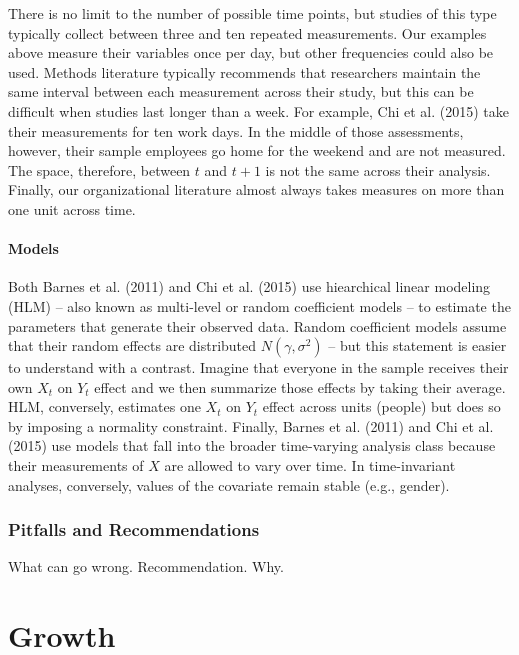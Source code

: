 \documentclass[english,,man]{apa6}
\let\oldparagraph\paragraph
\renewcommand{\paragraph}[1]{\oldparagraph{#1}\mbox{}}
\theoremstyle{definition}
\theoremstyle{definition}
\theoremstyle{definition}
\theoremstyle{remark}
\begin{document}
There is no limit to the number of possible time points, but studies of
this type typically collect between three and ten repeated measurements.
Our examples above measure their variables once per day, but other
frequencies could also be used. Methods literature typically recommends
that researchers maintain the same interval between each measurement
across their study, but this can be difficult when studies last longer
than a week. For example, Chi et al. (2015) take their measurements for
ten work days. In the middle of those assessments, however, their sample
employees go home for the weekend and are not measured. The space,
therefore, between \(t\) and \(t + 1\) is not the same across their
analysis. Finally, our organizational literature almost always takes
measures on more than one unit across time.

\hypertarget{models}{%
\paragraph{Models}\label{models}}

Both Barnes et al. (2011) and Chi et al. (2015) use hiearchical linear
modeling (HLM) -- also known as multi-level or random coefficient models
-- to estimate the parameters that generate their observed data. Random
coefficient models assume that their random effects are distributed
\(N(\gamma, \sigma^2)\) -- but this statement is easier to understand
with a contrast. Imagine that everyone in the sample receives their own
\(X_t\) on \(Y_t\) effect and we then summarize those effects by taking
their average. HLM, conversely, estimates one \(X_t\) on \(Y_t\) effect
across units (people) but does so by imposing a normality constraint.
Finally, Barnes et al. (2011) and Chi et al. (2015) use models that fall
into the broader time-varying analysis class because their measurements
of \(X\) are allowed to vary over time. In time-invariant analyses,
conversely, values of the covariate remain stable (e.g., gender).

\hypertarget{pitfalls-and-recommendations}{%
\subsubsection{Pitfalls and
Recommendations}\label{pitfalls-and-recommendations}}

What can go wrong. Recommendation. Why.

\hypertarget{growth}{%
\section{Growth}\label{growth}}
\end{document}
